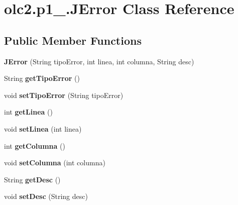 \hypertarget{classolc2_1_1p1__201504242_1_1_j_error}{}\section{olc2.\+p1\+\_.\+J\+Error Class Reference}
\label{classolc2_1_1p1__201504242_1_1_j_error}
\subsection*{Public Member Functions}
\begin{DoxyCompactItemize}
\item 
\mbox{\label{classolc2_1_1p1__201504242_1_1_j_error_a4903663b02145da13646cff7044e883c}} 
{\bfseries J\+Error} (String tipo\+Error, int linea, int columna, String desc)
\item 
\mbox{\label{classolc2_1_1p1__201504242_1_1_j_error_a955d0b2ad6b278522be4aa098c6bf743}} 
String {\bfseries get\+Tipo\+Error} ()
\item 
\mbox{\label{classolc2_1_1p1__201504242_1_1_j_error_a264576d9bef73dc703eda986a3655d3a}} 
void {\bfseries set\+Tipo\+Error} (String tipo\+Error)
\item 
\mbox{\label{classolc2_1_1p1__201504242_1_1_j_error_a65cf04e0575990431de411d523edab64}} 
int {\bfseries get\+Linea} ()
\item 
\mbox{\label{classolc2_1_1p1__201504242_1_1_j_error_a6ff5511f1825dbb15e3447c310183dac}} 
void {\bfseries set\+Linea} (int linea)
\item 
\mbox{\label{classolc2_1_1p1__201504242_1_1_j_error_a644b16409ee68752bed37318d8c1cbbf}} 
int {\bfseries get\+Columna} ()
\item 
\mbox{\label{classolc2_1_1p1__201504242_1_1_j_error_a02ca8c5018a5e41befed94aa273d302f}} 
void {\bfseries set\+Columna} (int columna)
\item 
\mbox{\label{classolc2_1_1p1__201504242_1_1_j_error_aa63dcf0cc471aaba81f26104936c32e4}} 
String {\bfseries get\+Desc} ()
\item 
\mbox{\label{classolc2_1_1p1__201504242_1_1_j_error_af5285d0604a52631ebd3f0383d3aa120}} 
void {\bfseries set\+Desc} (String desc)
\end{DoxyCompactItemize}


